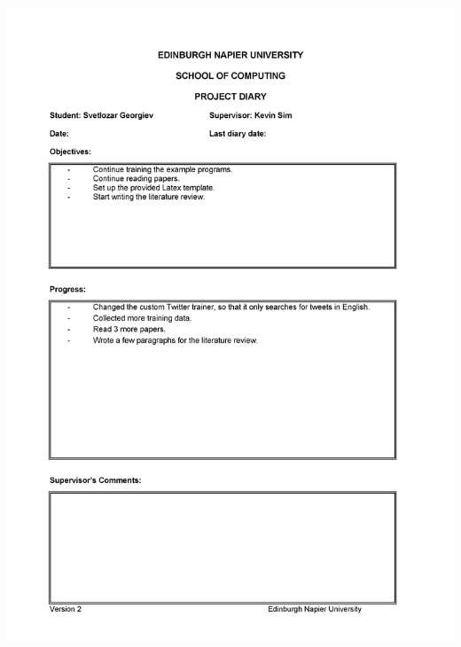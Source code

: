 \documentclass[12pt,a4paper]{article}
\begin{document}
\begin{appendices}
\includegraphics[width=\textwidth,height=\textheight,keepaspectratio]{diary4.png} 
\newpage

\end{appendices}
\end{document}
